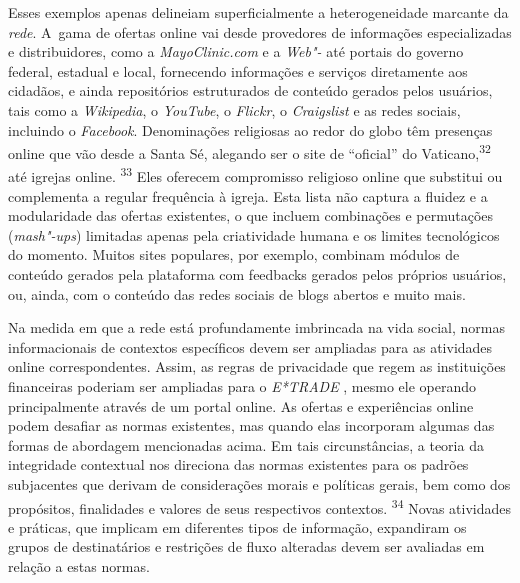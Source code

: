 Esses exemplos apenas delineiam superficialmente a heterogeneidade
marcante da \emph{rede}. A~gama de ofertas online vai desde provedores
de informações especializadas e distribuidores, como a
\emph{MayoClinic.com} e a \emph{Web"-} até portais do governo federal,
estadual e local, fornecendo informações e serviços diretamente aos
cidadãos, e ainda repositórios estruturados de conteúdo gerados pelos
usuários, tais como a \emph{Wikipedia}, o \emph{YouTube}, o
\emph{Flickr}, o \emph{Craigslist} e as redes sociais, incluindo o
\emph{Facebook}. Denominações religiosas ao redor do globo têm presenças
online que vão desde a Santa Sé, alegando ser o site de ``oficial'' do
Vaticano,\textsuperscript{{32}} até igrejas online.
\textsuperscript{{33}} Eles oferecem compromisso religioso online que
substitui ou complementa a regular frequência à igreja. Esta lista não
captura a fluidez e a modularidade das ofertas existentes, o que incluem
combinações e permutações (\emph{mash"-ups}) limitadas apenas pela
criatividade humana e os limites tecnológicos do momento. Muitos sites
populares, por exemplo, combinam módulos de conteúdo gerados pela
plataforma com feedbacks gerados pelos próprios usuários, ou, ainda, com
o conteúdo das redes sociais de blogs abertos e muito mais.

Na medida em que a rede está profundamente imbrincada na vida social,
normas informacionais de contextos específicos devem ser ampliadas para
as atividades online correspondentes. Assim, as regras de privacidade
que regem as instituições financeiras poderiam ser ampliadas para o
\emph{E*TRADE} , mesmo ele operando principalmente através de um portal
online. As ofertas e experiências online podem desafiar as normas
existentes, mas quando elas incorporam algumas das formas de abordagem
mencionadas acima. Em tais circunstâncias, a teoria da integridade
contextual nos direciona das normas existentes para os padrões
subjacentes que derivam de considerações morais e políticas gerais, bem
como dos propósitos, finalidades e valores de seus respectivos
contextos. \textsuperscript{{34}} Novas atividades e práticas, que
implicam em diferentes tipos de informação, expandiram os grupos de
destinatários e restrições de fluxo alteradas devem ser avaliadas em
relação a estas normas.


